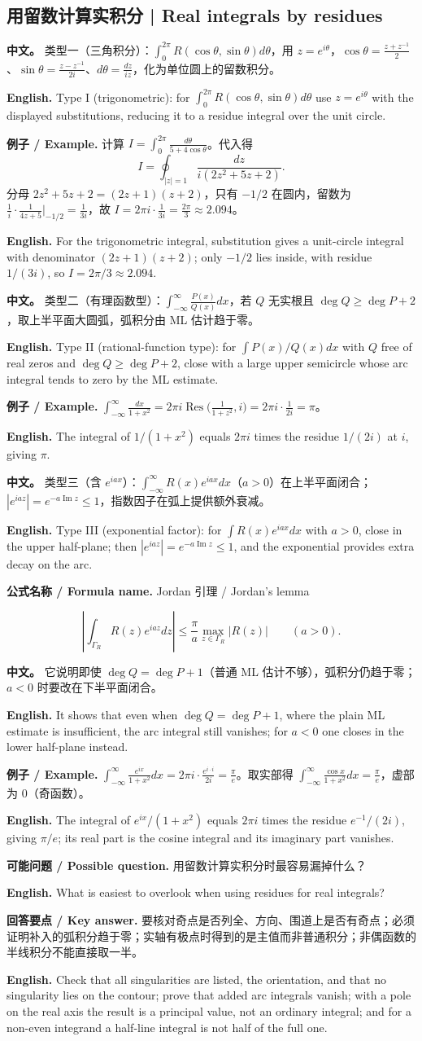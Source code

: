 \documentclass[UTF8,11pt,a4paper]{ctexart}
\newcommand{\EN}[1]{\par\noindent \textbf{English.} #1\par}
\newcommand{\FORMULA}[2]{\par\noindent\textbf{公式名称 / Formula name.} #1 / #2\par}
\newcommand{\EX}[2]{\par\noindent \textbf{例子 / Example.} #1\par\EN{#2}}
\newcommand{\ASK}[4]{\par\noindent \textbf{可能问题 / Possible question.} #1\par\EN{#2}\noindent \textbf{回答要点 / Key answer.} #3\par\EN{#4}\medskip}
\newcommand{\APS}[2]{\par\noindent\textbf{中文。} #1\par\noindent\textbf{English.} #2\par\smallskip}
\begin{document}
\subsection{用留数计算实积分 | Real integrals by residues}
\APS{类型一（三角积分）：$\int_0^{2\pi}R(\cos\theta,\sin\theta)d\theta$，用 $z=e^{i\theta}$，$\cos\theta=\frac{z+z^{-1}}2$、$\sin\theta=\frac{z-z^{-1}}{2i}$、$d\theta=\frac{dz}{iz}$，化为单位圆上的留数积分。}{Type I (trigonometric): for $\int_0^{2\pi}R(\cos\theta,\sin\theta)d\theta$ use $z=e^{i\theta}$ with the displayed substitutions, reducing it to a residue integral over the unit circle.}
\EX{计算 $I=\int_0^{2\pi}\frac{d\theta}{5+4\cos\theta}$。代入得
\[
I=\oint_{|z|=1}\frac{dz}{i(2z^2+5z+2)}.
\]
分母 $2z^2+5z+2=(2z+1)(z+2)$，只有 $-1/2$ 在圆内，留数为 $\frac1i\cdot\frac1{4z+5}\big|_{-1/2}=\frac1{3i}$，故 $I=2\pi i\cdot\frac1{3i}=\frac{2\pi}{3}\approx2.094$。}{For the trigonometric integral, substitution gives a unit-circle integral with denominator $(2z+1)(z+2)$; only $-1/2$ lies inside, with residue $1/(3i)$, so $I=2\pi/3\approx2.094$.}
\APS{类型二（有理函数型）：$\int_{-\infty}^{\infty}\frac{P(x)}{Q(x)}dx$，若 $Q$ 无实根且 $\deg Q\ge\deg P+2$，取上半平面大圆弧，弧积分由 ML 估计趋于零。}{Type II (rational-function type): for $\int P(x)/Q(x)dx$ with $Q$ free of real zeros and $\deg Q\ge\deg P+2$, close with a large upper semicircle whose arc integral tends to zero by the ML estimate.}
\EX{$\int_{-\infty}^{\infty}\frac{dx}{1+x^2}=2\pi i\operatorname{Res}\big(\frac1{1+z^2},i\big)=2\pi i\cdot\frac1{2i}=\pi$。}{The integral of $1/(1+x^2)$ equals $2\pi i$ times the residue $1/(2i)$ at $i$, giving $\pi$.}
\APS{类型三（含 $e^{iax}$）：$\int_{-\infty}^{\infty}R(x)e^{iax}dx$（$a>0$）在上半平面闭合；$|e^{iaz}|=e^{-a\operatorname{Im}z}\le1$，指数因子在弧上提供额外衰减。}{Type III (exponential factor): for $\int R(x)e^{iax}dx$ with $a>0$, close in the upper half-plane; then $|e^{iaz}|=e^{-a\operatorname{Im}z}\le1$, and the exponential provides extra decay on the arc.}
\FORMULA{Jordan 引理}{Jordan's lemma}
\[
\left|\int_{\Gamma_R}R(z)e^{iaz}dz\right|\le\frac{\pi}{a}\max_{z\in\Gamma_R}|R(z)|\qquad(a>0).
\]
\APS{它说明即使 $\deg Q=\deg P+1$（普通 ML 估计不够），弧积分仍趋于零；$a<0$ 时要改在下半平面闭合。}{It shows that even when $\deg Q=\deg P+1$, where the plain ML estimate is insufficient, the arc integral still vanishes; for $a<0$ one closes in the lower half-plane instead.}
\EX{$\int_{-\infty}^{\infty}\frac{e^{ix}}{1+x^2}dx=2\pi i\cdot\frac{e^{i\cdot i}}{2i}=\frac{\pi}{e}$。取实部得 $\int_{-\infty}^{\infty}\frac{\cos x}{1+x^2}dx=\frac{\pi}{e}$，虚部为 $0$（奇函数）。}{The integral of $e^{ix}/(1+x^2)$ equals $2\pi i$ times the residue $e^{-1}/(2i)$, giving $\pi/e$; its real part is the cosine integral and its imaginary part vanishes.}
\ASK{用留数计算实积分时最容易漏掉什么？}{What is easiest to overlook when using residues for real integrals?}{要核对奇点是否列全、方向、围道上是否有奇点；必须证明补入的弧积分趋于零；实轴有极点时得到的是主值而非普通积分；非偶函数的半线积分不能直接取一半。}{Check that all singularities are listed, the orientation, and that no singularity lies on the contour; prove that added arc integrals vanish; with a pole on the real axis the result is a principal value, not an ordinary integral; and for a non-even integrand a half-line integral is not half of the full one.}
\end{document}
